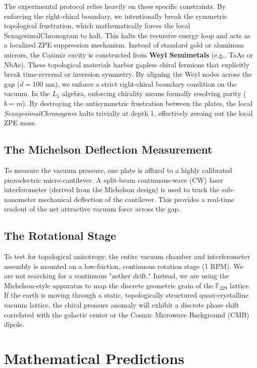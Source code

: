 The experimental protocol relies heavily on these specific constraints. By enforcing the right-chiral boundary, we intentionally break the symmetric topological frustration, which mathematically forces the local SexagesimalChronogram to halt. This halts the recursive energy loop and acts as a localized ZPE suppression mechanism.
Instead of standard gold or aluminum mirrors, the Casimir cavity is constructed from \textbf{Weyl Semimetals} (e.g., TaAs or NbAs). These topological materials harbor gapless chiral fermions that explicitly break time-reversal or inversion symmetry. By aligning the Weyl nodes across the gap ($d = 100\text{ nm}$), we enforce a strict right-chiral boundary condition on the vacuum. In the $L_5$ algebra, enforcing chirality means formally resolving parity ($b = m$). By destroying the antisymmetric frustration between the plates, the local \emph{SexagesimalChronogram} halts trivially at depth 1, effectively zeroing out the local ZPE mass.

\subsection{The Michelson Deflection Measurement}\label{sec:michelson}
To measure the vacuum pressure, one plate is affixed to a highly calibrated piezoelectric micro-cantilever. A split-beam continuous-wave (CW) laser interferometer (derived from the Michelson design) is used to track the sub-nanometer mechanical deflection of the cantilever. This provides a real-time readout of the net attractive vacuum force across the gap.

\subsection{The Rotational Stage}\label{sec:rotation}
To test for topological anisotropy, the entire vacuum chamber and interferometer assembly is mounted on a low-friction, continuous rotation stage (1 RPM). We are not searching for a continuous "aether drift." Instead, we are using the Michelson-style apparatus to map the discrete geometric grain of the $\mathbb{F}_{229}$ lattice. If the earth is moving through a static, topologically structured quasi-crystalline vacuum lattice, the chiral pressure anomaly will exhibit a discrete phase shift correlated with the galactic center or the Cosmic Microwave Background (CMB) dipole.

\section{Mathematical Predictions}\label{sec:math}

